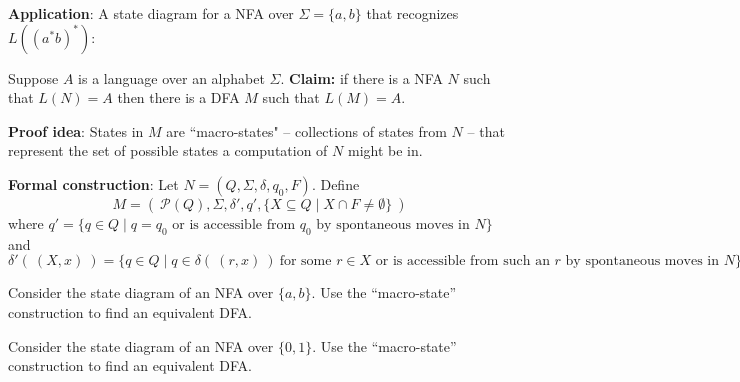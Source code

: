 \documentclass[12pt, oneside]{article}
\begin{document}
{\bf Application}: A state diagram for a NFA over $\Sigma = \{a,b\}$ 
that recognizes $L (( a^*b)^* )$:

\vfill
\newpage
Suppose $A$ is a language over an alphabet $\Sigma$.
{\bf Claim:} if there is a NFA $N$ such that $L(N) = A$ then 
there is a DFA $M$ such that $L(M) = A$.

{\bf Proof idea}: States in $M$ are ``macro-states" -- collections of states from $N$ -- 
that represent the set of possible states a computation of $N$ might be in.


{\bf Formal construction}: Let $N = (Q, \Sigma, \delta, q_0, F)$.  Define 
\[
M = (~ \mathcal{P}(Q), \Sigma, \delta', q',  \{ X \subseteq Q \mid X \cap F \neq \emptyset \}~ )
\]
where $q' = \{ q \in Q \mid \text{$q = q_0$ or is accessible from $q_0$ by spontaneous moves in $N$} \}$
and 
\[
    \delta' (~(X, x)~) = \{ q \in Q \mid q \in \delta( ~(r,x)~) ~\text{for some $r \in X$ or is accessible 
from such an $r$ by spontaneous moves in $N$} \}
\]


Consider the state diagram of an NFA over $\{a,b\}$. Use the ``macro-state'' construction 
to find an equivalent DFA.


\vfill

Consider the state diagram of an NFA over $\{0,1\}$. Use the ``macro-state'' construction 
to find an equivalent DFA.

\end{document}
